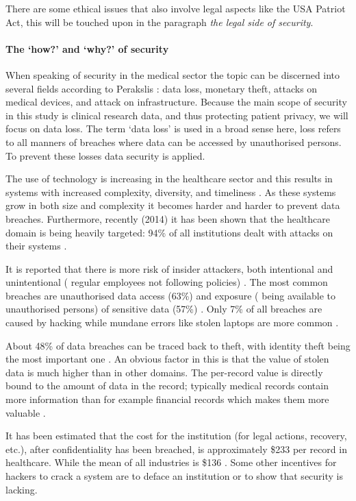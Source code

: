 There are some ethical issues that also involve legal aspects like the USA Patriot Act, this will be touched upon in the paragraph \emph{the legal side of security}.

\paragraph{The `how?' and `why?' of security}
\label{security-how-why}

When speaking of security in the medical sector the topic can be discerned into several fields according to Perakslis \cite{s2Perakslis2014}: data loss, monetary theft, attacks on medical devices, and attack on infrastructure.
Because the main scope of security in this study is clinical research data, and thus protecting patient privacy, we will focus on data loss.
The term `data loss' is used in a broad sense here, loss refers to all manners of breaches where data can be accessed by unauthorised persons.
To prevent these losses data security is applied.

The use of technology is increasing in the healthcare sector and this results in systems with increased complexity, diversity, and timeliness \cite{s13Patil2014}.
As these systems grow in both size and complexity it becomes harder and harder to prevent data breaches.
Furthermore, recently (2014) it has been shown that the healthcare domain is being heavily targeted: 94\% of all institutions dealt with attacks on their systems \cite{s2Perakslis2014}.

It is reported that there is more risk of insider attackers, both intentional and unintentional (\eg{} regular employees not following policies) \cite{s1Zamosky2014}.
The most common breaches are unauthorised data access (63\%) and exposure (\ie{} being available to unauthorised persons) of sensitive data (57\%) \cite{s18Kum2014}.
Only 7\% of all breaches are caused by hacking while mundane errors like stolen laptops are more common \cite{s1Zamosky2014}.

About 48\% of data breaches can be traced back to theft, with identity theft being the most important one \cite{s1Zamosky2014}.
An obvious factor in this is that the value of stolen data is much higher than in other domains.
The per-record value is directly bound to the amount of data in the record; typically medical records contain more information than for example financial records which makes them more valuable \cite{s1Zamosky2014}.

It has been estimated that the cost for the institution (for legal actions, recovery, etc.), after confidentiality has been breached, is approximately \$233 per record in healthcare.
While the mean of all industries is \$136 \cite{s2Perakslis2014}.
Some other incentives for hackers to crack a system are to deface an institution or to show that security is lacking.

